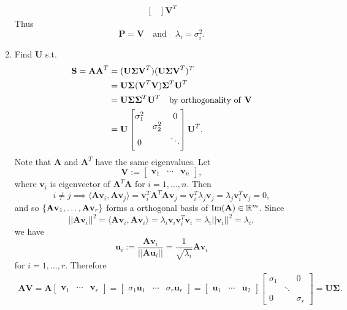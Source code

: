 \documentclass[12pt,openany]{book}
\theoremstyle{definition}
\newcommand{\R}{\mathbb{R}}
\newcommand{\inner}[1]{\langle #1\rangle}
\newcommand{\norms}[1]{|| #1||}
\renewcommand{\vec}[1]{\textbf{#1}}
\begin{document}
\begin{enumerate}[(Step 1)]
\begin{align*}
\begin{bmatrix}
			\end{bmatrix}\textbf{V}^T
		\end{align*} Thus \[
		\textbf{P}=\textbf{V}\quad\text{and}\quad\lambda_i=\sigma_i^2.
		\]
		\item Find \(\textbf{U}\) s.t. \begin{align*}
			\textbf{S}=\textbf{A}\textbf{A}^T&=(\textbf{U}\boldsymbol{\Sigma}\textbf{V}^T)(\textbf{U}\boldsymbol{\Sigma}\textbf{V}^T)^T\\
			&=\textbf{U}\boldsymbol{\Sigma}(\textbf{V}^T\textbf{V})\boldsymbol{\Sigma}^T\textbf{U}^T\\
			&=\textbf{U}\boldsymbol{\Sigma}\boldsymbol{\Sigma}^T\textbf{U}^T\quad\text{by orthogonality of \textbf{V}}\\
			&=\textbf{U}\begin{bmatrix}
				\sigma_1^2 &  & 0\\
				& \sigma_2^2 & \\
				0 &  & \ddots
			\end{bmatrix}\textbf{U}^T.
		\end{align*} Note that \(\textbf{A}\) and \(\textbf{A}^T\) have the same eigenvalues. Let \[
		\textbf{V}:=\begin{bmatrix}
			\vec{v}_1&\cdots&\vec{v}_n
		\end{bmatrix},
		\] where $\vec{v}_i$ is eigenvector of \(\textbf{A}^T\textbf{A}\) for $i=1,\dots,n$. Then \[
		i\neq j\implies\inner{\textbf{A}\vec{v}_i,\textbf{A}\vec{v}_j}=\vec{v}_i^T\textbf{A}^T\textbf{A}\vec{v}_j=\vec{v}_i^T\lambda_j\vec{v}_j=\lambda_j\vec{v}_i^T\vec{v}_j=0,
		\] and so \(\set{\textbf{A}\vec{v}_1,\dots,\textbf{A}\vec{v}_r}\) forms a orthogonal basis of \(\textnormal{Im}(\textbf{A})\in\R^m\).
		Since \[
		\norms{\textbf{A}\vec{v}_i}^2=\inner{\textbf{A}\vec{v}_i,\textbf{A}\vec{v}_i}=\lambda_i\vec{v}_i\vec{v}_i^T\vec{v}_i=\lambda_i\norms{\vec{v}_i}^2=\lambda_i,
		\] we have \[
		\textbf{u}_i:=\frac{\textbf{A}\vec{v}_i}{\norms{\textbf{A}\vec{u}_i}}=\frac{1}{\sqrt{\lambda_i}}\textbf{A}\vec{v}_i
		\] for \(i=1,\dots, r\).
		Therefore \begin{align*}
			\textbf{A}\textbf{V}=\textbf{A}\begin{bmatrix}
				\vec{v}_1&\cdots&\vec{v}_r
			\end{bmatrix}=\begin{bmatrix}
			\sigma_1\vec{u}_1&\cdots&\sigma_r\vec{u}_r
		\end{bmatrix}
		=\begin{bmatrix}
			\vec{u}_1 &\cdots&\vec{u}_2
		\end{bmatrix}\begin{bmatrix}
		\sigma_1 &&0\\&\ddots&\\0&&\sigma_r
	\end{bmatrix}=\textbf{U}\boldsymbol{\Sigma}.
		\end{align*}
	\end{enumerate}
	
\end{document}

